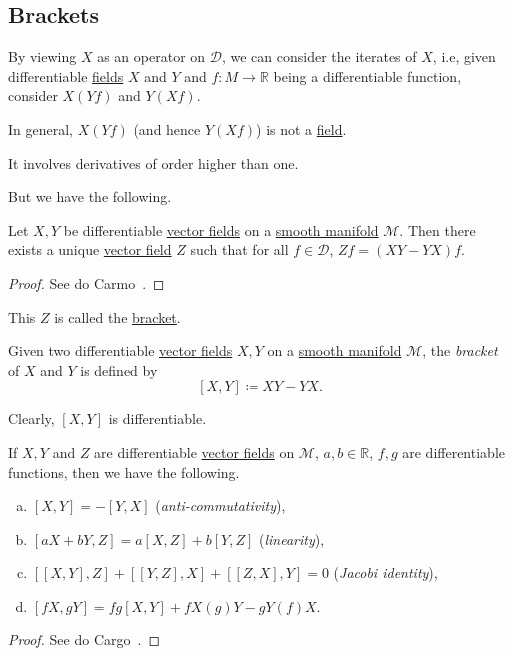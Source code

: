 \subsection{Brackets}
By viewing \(X\) as an operator on \(\mathcal{D} \), we can consider the iterates of \(X\), i.e, given differentiable \hyperref[def:vector-field]{fields} \(X\) and \(Y\) and \(f\colon M \to \mathbb{R} \) being a differentiable function, consider \(X(Y f)\) and \(Y(X f)\).

\begin{note}
	In general, \(X(Y f)\) (and hence \(Y(X f)\)) is not a \hyperref[def:vector-field]{field}.
\end{note}
\begin{explanation}
	It involves derivatives of order higher than one.
\end{explanation}

But we have the following.

\begin{lemma}
	Let \(X, Y\) be differentiable \hyperref[def:vector-field]{vector fields} on a \hyperref[def:smooth-manifold]{smooth manifold} \(\mathcal{M} \). Then there exists a unique \hyperref[def:vector-field]{vector field} \(Z\) such that for all \(f\in \mathcal{D} \), \(Zf = (XY - YX)f\).
\end{lemma}
\begin{proof}
	See do Carmo~\cite[Chapter 0, Lemma 5.2]{flaherty2013riemannian}.
\end{proof}

This \(Z\) is called the \hyperref[def:bracket]{bracket}.

\begin{definition}[Bracket]\label{def:bracket}
	Given two differentiable \hyperref[def:vector-field]{vector fields} \(X, Y\) on a \hyperref[def:smooth-manifold]{smooth manifold} \(\mathcal{M} \), the \emph{bracket} of \(X\) and \(Y\) is defined by
	\[
		[X, Y] \coloneqq XY - YX.
	\]
\end{definition}

Clearly, \([X, Y]\) is differentiable.

\begin{proposition}
	If \(X, Y\) and \(Z\) are differentiable \hyperref[def:vector-field]{vector fields} on \(\mathcal{M} \), \(a, b\in \mathbb{R} \), \(f, g\) are differentiable functions, then we have the following.
	\begin{enumerate}[(a)]
		\item \([X, Y] = -[Y, X]\) (\emph{anti-commutativity}),
		\item \([aX + bY, Z] = a[X, Z] + b[Y, Z]\) (\emph{linearity}),
		\item \([[X, Y], Z] + [[Y, Z], X] + [[Z, X], Y] = 0\) (\emph{Jacobi identity}),
		\item \([fX, gY] = fg[X, Y] + fX(g)Y - gY(f)X\).
	\end{enumerate}
\end{proposition}
\begin{proof}
	See do Cargo~\cite[Chapter 0, Proposition 5.3]{flaherty2013riemannian}.
\end{proof}


